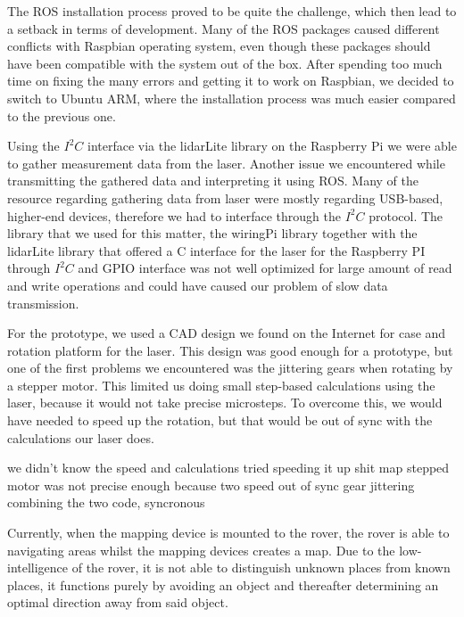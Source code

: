 The ROS installation process proved to be quite the challenge, which then lead to a setback in terms of development. Many of the ROS packages caused different conflicts with Raspbian operating system, even though these packages should have been compatible with the system out of the box. After spending too much time on fixing the many errors and getting it to work on Raspbian, we decided to switch to Ubuntu ARM, where the installation process was much easier compared to the previous one.

Using the $I^2C$ interface via the lidarLite library on the Raspberry Pi we were able to gather measurement data from the laser. Another issue we encountered while transmitting the gathered data and interpreting it using ROS. Many of the resource regarding gathering data from laser were mostly regarding USB-based, higher-end devices, therefore we had to interface through the $I^2C$ protocol. The library that we used for this matter, the wiringPi library together with the lidarLite library that offered a C interface for the laser for the Raspberry PI through $I^2C$ and GPIO interface was not well optimized for large amount of read and write operations and could have caused our problem of slow data transmission.

For the prototype, we used a CAD design we found on the Internet for case and rotation platform for the laser. This design was good enough for a prototype, but one of the first problems we encountered was the jittering gears when rotating by a stepper motor. This limited us doing small step-based calculations using the laser, because it would not take precise microsteps. To overcome this, we would have needed to speed up the rotation, but that would be out of sync with the calculations our laser does.

we didn't know the speed and calculations
tried speeding it up
shit map
stepped motor was not precise enough because two speed
out of sync
gear jittering
combining the two code, syncronous



Currently, when the mapping device is mounted to the rover, the rover is able to navigating areas whilst the mapping devices creates a map. Due to the low-intelligence of the rover, it is not able to distinguish unknown places from known places, it functions purely by avoiding an object and thereafter determining an optimal direction away from said object.

